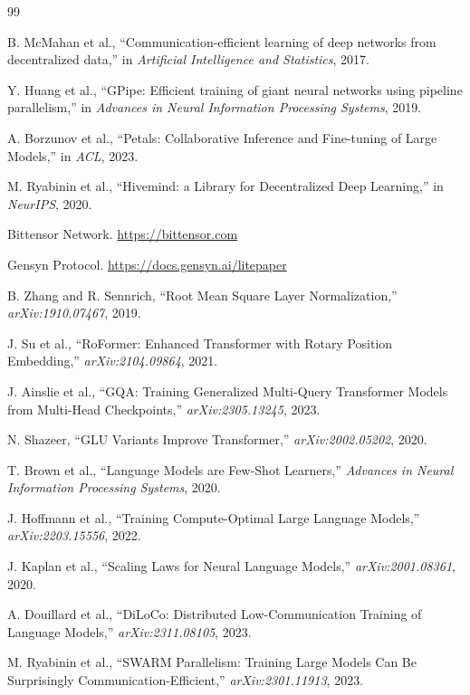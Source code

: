 \documentclass[11pt,a4paper]{article}
\begin{document}

\begin{thebibliography}{99}

B. McMahan et al., ``Communication-efficient learning of deep networks from decentralized data,'' in \textit{Artificial Intelligence and Statistics}, 2017.

Y. Huang et al., ``GPipe: Efficient training of giant neural networks using pipeline parallelism,'' in \textit{Advances in Neural Information Processing Systems}, 2019.

A. Borzunov et al., ``Petals: Collaborative Inference and Fine-tuning of Large Models,'' in \textit{ACL}, 2023.

M. Ryabinin et al., ``Hivemind: a Library for Decentralized Deep Learning,'' in \textit{NeurIPS}, 2020.

Bittensor Network. \url{https://bittensor.com}

Gensyn Protocol. \url{https://docs.gensyn.ai/litepaper}

B. Zhang and R. Sennrich, ``Root Mean Square Layer Normalization,'' \textit{arXiv:1910.07467}, 2019.

J. Su et al., ``RoFormer: Enhanced Transformer with Rotary Position Embedding,'' \textit{arXiv:2104.09864}, 2021.

J. Ainslie et al., ``GQA: Training Generalized Multi-Query Transformer Models from Multi-Head Checkpoints,'' \textit{arXiv:2305.13245}, 2023.

N. Shazeer, ``GLU Variants Improve Transformer,'' \textit{arXiv:2002.05202}, 2020.

T. Brown et al., ``Language Models are Few-Shot Learners,'' \textit{Advances in Neural Information Processing Systems}, 2020.

J. Hoffmann et al., ``Training Compute-Optimal Large Language Models,'' \textit{arXiv:2203.15556}, 2022.

J. Kaplan et al., ``Scaling Laws for Neural Language Models,'' \textit{arXiv:2001.08361}, 2020.

A. Douillard et al., ``DiLoCo: Distributed Low-Communication Training of Language Models,'' \textit{arXiv:2311.08105}, 2023.

M. Ryabinin et al., ``SWARM Parallelism: Training Large Models Can Be Surprisingly Communication-Efficient,'' \textit{arXiv:2301.11913}, 2023.

\end{thebibliography}
\end{document}
